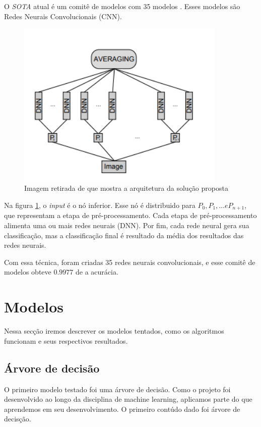 \documentclass[a4paper,10pt]{article}
\begin{document}
O \textit{SOTA} atual é um comitê de modelos com 35 modelos \cite{DBLP}. Esses modelos são Redes Neurais Convolucionais (CNN). 

\begin{figure}[h]
        \centering
        \includegraphics[width=10cm]{sota.png}
        \caption{Imagem retirada de \cite{DBLP} que mostra a arquitetura da solução proposta}
        \label{fig:sota}
\end{figure}

Na figura \ref{fig:sota}, o \textit{input} é o nó inferior. Esse nó é distribuido para $P_0, P_1, \dots e P_{n+1}$, que representam a etapa de pré-processamento. Cada etapa de pré-processamento alimenta uma ou mais redes neurais (DNN). Por fim, cada rede neural gera sua classificação, mas a classificação final é resultado da média dos resultados das redes neurais.

Com essa técnica, foram criadas 35 redes neurais convolucionais, e esse comitê de modelos obteve $0.9977$ de a acurácia.

\section{Modelos}

Nessa secção iremos descrever os modelos tentados, como os algoritmos funcionam e seus respectivos resultados. 

\subsection{Árvore de decisão}

O primeiro modelo testado foi uma árvore de decisão. Como o projeto foi desenvolvido ao longo da disciplina de machine learning, aplicamos parte do que aprendemos em seu desenvolvimento. O primeiro contúdo dado foi árvore de decisção. 
\end{document}
